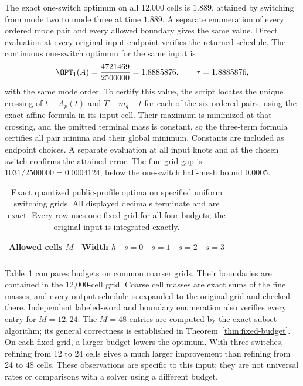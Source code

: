 The exact one-switch optimum on all 12,000 cells is $1.889$, attained by
switching from mode two to mode three at time $1.889$. A separate enumeration
of every ordered mode pair and every allowed boundary gives the same value.
Direct evaluation at every original input endpoint verifies the returned
schedule. The continuous one-switch optimum for the same input is
\begin{equation}\label{eq:public-continuous}
 \OPT_1(A)=\frac{4721469}{2500000}=1.8885876,
 \qquad \tau=1.8885876,
\end{equation}
with the same mode order. To certify this value, the script locates the unique
crossing of $t-A_p(t)$ and $T-m_q-t$ for each of the six ordered pairs,
using the exact affine formula in its input cell. Their maximum is minimized
at that crossing, and the omitted terminal mass is constant, so the
three-term formula certifies all pair minima and their global minimum.
Constants are included as endpoint choices. A separate evaluation at all
input knots and at the chosen switch confirms the attained error.
The fine-grid gap is $1031/2500000=0.0004124$, below the one-switch half-mesh
bound $0.0005$.

\begin{table}[tb]
\centering\small
\caption{Exact quantized public-profile optima on specified uniform switching
grids. All displayed decimals terminate and are exact. Every row uses one
fixed grid for all four budgets; the original input is integrated exactly.}
\label{tab:public-profile}
\begin{tabular}{@{}rrrrrr@{}}
\toprule
Allowed cells $M$ & Width $h$ & $s=0$ & $s=1$ & $s=2$ & $s=3$\\
\midrule
\\
\bottomrule
\end{tabular}
\end{table}

Table~\ref{tab:public-profile} compares budgets on common coarser grids. Their
boundaries are contained in the 12,000-cell grid. Coarse cell masses are exact
sums of the fine masses, and every output schedule is expanded to the original
grid and checked there. Independent labeled-word and boundary enumeration
also verifies every entry for $M=12,24$. The $M=48$ entries are computed by the
exact subset algorithm; its general correctness is established in
Theorem~\ref{thm:fixed-budget}. On each fixed grid, a larger budget lowers
the optimum. With three switches, refining from 12 to 24 cells gives a much
larger improvement than refining from 24 to 48 cells. These observations are
specific to this input; they are not universal rates or comparisons with a
solver using a different budget.

